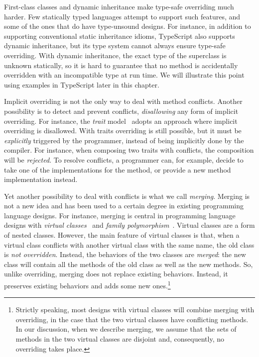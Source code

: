 First-class classes and dynamic inheritance make type-safe overriding much
harder. Few statically typed languages attempt to support such features, and
some of the ones that do have type-unsound designs. For instance, in addition to
supporting conventional static inheritance idioms, TypeScript also supports
dynamic inheritance, but its type system cannot always ensure type-safe
overriding. With dynamic inheritance, the exact type of the superclass is
unknown statically, so it is hard to guarantee that no method is accidentally
overridden with an incompatible type at run time. We will illustrate this point
using examples in TypeScript later in this chapter.

Implicit overriding is not the only way to deal with method conflicts. Another
possibility is to detect and prevent conflicts, \emph{disallowing} any form of
implicit overriding. For instance, the \emph{trait}
model~\citep{ducasse2006traits} adopts an approach where implicit overriding is
disallowed. With traits overriding is still possible, but it must be
\emph{explicitly} triggered by the programmer, instead of being implicitly done
by the compiler. For instance, when composing two traits with conflicts, the
composition will be \emph{rejected}. To resolve conflicts, a programmer can, for
example, decide to take one of the implementations for the method, or provide a
new method implementation instead. 

Yet another possibility to deal with conflicts is what we call \emph{merging}.
Merging is not a new idea and has been used to a certain degree in existing
programming language designs. For instance, merging is central in programming
language designs with \emph{virtual
classes}~\citep{madsen1989virtual,ernst2006virtual,clarke2007tribe} and
\emph{family
polymorphism}~\citep{ernst2001family,saito2008lightweight,zhang2017familia}.
Virtual classes are a form of nested classes. However, the main feature of
virtual classes is that, when a virtual class conflicts with another virtual
class with the same name, the old class is \emph{not overridden}. Instead, the
behaviors of the two classes are \emph{merged}: the new class will contain all
the methods of the old class as well as the new methods. So, unlike overriding,
merging does not replace existing behaviors. Instead, it preserves existing
behaviors and adds some new ones.\footnote{Strictly speaking, most designs with
virtual classes will combine merging with overriding, in the case that the two
virtual classes have conflicting methods. In our discussion, when we describe
merging, we assume that the sets of methods in the two virtual classes are
disjoint and, consequently, no overriding takes place.}


